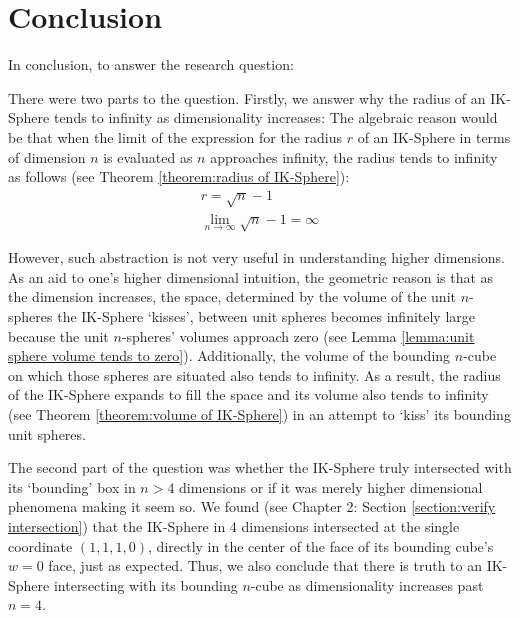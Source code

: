\section{Conclusion}
In conclusion, to answer the research question:
\researchquestion{}

There were two parts to the question. Firstly, we answer why the radius of an IK-Sphere tends to infinity as dimensionality increases:
The algebraic reason would be that when the limit of the expression for the radius $r$ of an IK-Sphere in terms of dimension $n$ is evaluated as $n$ approaches infinity, the radius tends to infinity as follows (see Theorem \ref{theorem:radius of IK-Sphere}):
\begin{align*} %
    r = \sqrt{n}-1\\
    \lim_{n \to \infty}\sqrt{n}-1 = \infty
\end{align*}

However, such abstraction is not very useful in understanding higher dimensions. As an aid to one's higher dimensional intuition, the geometric reason is that as the dimension increases, the space, determined by the volume of the unit $n$-spheres the IK-Sphere `kisses', between unit spheres becomes infinitely large because the unit $n$-spheres' volumes approach zero (see Lemma \ref{lemma:unit sphere volume tends to zero}). Additionally, the volume of the bounding $n$-cube on which those spheres are situated also tends to infinity. As a result, the radius of the IK-Sphere expands to fill the space and its volume also tends to infinity (see Theorem \ref{theorem:volume of IK-Sphere}) in an attempt to `kiss' its bounding unit spheres. 

The second part of the question was whether the IK-Sphere truly intersected with its `bounding' box in $n>4$ dimensions or if it was merely higher dimensional phenomena making it seem so. We found (see Chapter 2: Section \ref{section:verify intersection}) that the IK-Sphere in 4 dimensions intersected at the single coordinate $(1, 1, 1, 0)$, directly in the center of the face of its bounding cube's $w=0$ face, just as expected. Thus, we also conclude that there is truth to an IK-Sphere intersecting with its bounding $n$-cube as dimensionality increases past $n=4$.

